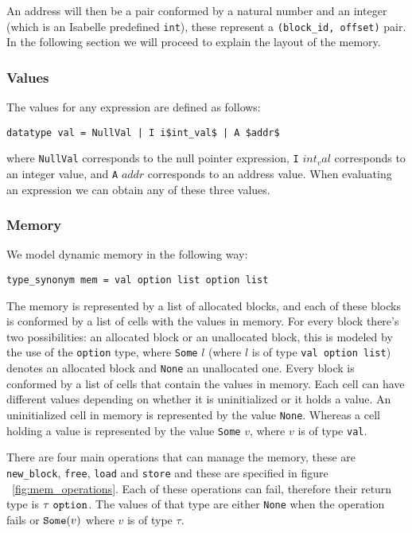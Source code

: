 An address will then be a pair conformed by a natural number and an integer (which is an Isabelle predefined \verb|int|), these represent a \verb|(block_id, offset)| pair.
In the following section we will proceed to explain the layout of the memory.

\subsubsection{Values} The values for any expression are defined as follows:

\begin{lstlisting}[frame=single, mathescape=true]
datatype val = NullVal | I i$int_val$ | A $addr$
\end{lstlisting}

where \verb|NullVal| corresponds to the null pointer expression, \verb|I| $int_val$ corresponds to an integer value, and \verb|A| $addr$ corresponds to an address value.
When evaluating an expression we can obtain any of these three values.

\subsubsection{Memory}

We model dynamic memory in the following way:

\begin{lstlisting}[frame=single, mathescape=true]
type_synonym mem = val option list option list
\end{lstlisting}

The memory is represented by a list of allocated blocks, and each of these blocks is conformed by a list of cells with the values in memory.
For every block there's two possibilities: an allocated block or an unallocated block, this is modeled by the use of the \verb|option| type, where \verb|Some| $l$ (where $l$ is of type \verb|val option list|) denotes an allocated block and \verb|None| an unallocated one.
Every block is conformed by a list of cells that contain the values in memory.
Each cell can have different values depending on whether it is uninitialized or it holds a value.
An uninitialized cell in memory is represented by the value \verb|None|.
Whereas a cell holding a value is represented by the value \verb|Some| $v$, where $v$ is of type \verb|val|.

There are four main operations that can manage the memory, these are \verb|new_block|, \verb|free|, \verb|load| and \verb|store| and these are specified in figure ~\ref{fig:mem_operations}.
Each of these operations can fail, therefore their return type is $\tau\ \verb|option|$.
The values of that type are either \verb|None| when the operation fails or $\verb|Some|(v)$ where $v$ is of type $\tau$.

